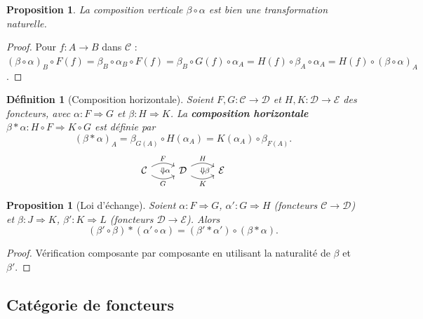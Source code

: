 \documentclass[a4paper,12pt]{book}
\newtheorem{proposition}[theoreme]{Proposition}
\newtheorem{definition}[theoreme]{Définition}
\begin{document}
\begin{proposition}\label{prop:comp-vert-naturelle}
La composition verticale $\beta \circ \alpha$ est bien une transformation naturelle.
\end{proposition}

\begin{proof}
Pour $f : A \to B$ dans $\mathcal{C}$ :
$(\beta \circ \alpha)_B \circ F(f) = \beta_B \circ \alpha_B \circ F(f) = \beta_B \circ G(f) \circ \alpha_A = H(f) \circ \beta_A \circ \alpha_A = H(f) \circ (\beta \circ \alpha)_A$.
\end{proof}

\begin{definition}[Composition horizontale]\label{def:comp-horizontale}
Soient $F, G : \mathcal{C} \to \mathcal{D}$ et $H, K : \mathcal{D} \to \mathcal{E}$ des foncteurs, avec $\alpha : F \Rightarrow G$ et $\beta : H \Rightarrow K$. La \textbf{composition horizontale} $\beta * \alpha : H \circ F \Rightarrow K \circ G$ est définie par
\[
  (\beta * \alpha)_A = \beta_{G(A)} \circ H(\alpha_A) = K(\alpha_A) \circ \beta_{F(A)}.
\]
\[
\begin{tikzcd}
  \mathcal{C}
    \arrow[r, bend left=30, "F", ""{name=U,below}]
    \arrow[r, bend right=30, "G"', ""{name=D}]
  & \mathcal{D}
    \arrow[r, bend left=30, "H", ""{name=V,below}]
    \arrow[r, bend right=30, "K"', ""{name=W}]
  & \mathcal{E}
  \arrow[Rightarrow, from=U, to=D, "\alpha"]
  \arrow[Rightarrow, from=V, to=W, "\beta"]
\end{tikzcd}
\]
\end{definition}

\begin{proposition}[Loi d'échange]\label{prop:loi-echange}
Soient $\alpha : F \Rightarrow G$, $\alpha' : G \Rightarrow H$ (foncteurs $\mathcal{C} \to \mathcal{D}$) et $\beta : J \Rightarrow K$, $\beta' : K \Rightarrow L$ (foncteurs $\mathcal{D} \to \mathcal{E}$). Alors
\[
  (\beta' \circ \beta) * (\alpha' \circ \alpha) = (\beta' * \alpha') \circ (\beta * \alpha).
\]
\end{proposition}

\begin{proof}
Vérification composante par composante en utilisant la naturalité de $\beta$ et $\beta'$.
\end{proof}

\subsection{Catégorie de foncteurs}
\end{document}
